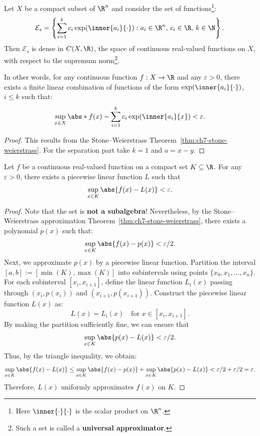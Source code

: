 \begin{corollary}\label{cor:ch7-exp-dense}
Let $X$ be a compact subset of $\R^n$ and consider the set of functions\footnote{Here $\inner{\cdot}{\cdot}$ is the scalar product on $\R^n$.}:
\begin{equation}\label{eq:ch7-exp-approx}
  \mathcal{E}_s = \left\{ \sum_{i=1}^{k} c_i \exp(\inner{a_i}{\cdot}) : a_i \in \R^n,\, c_i \in \R,\, k \in \N \right\}.
\end{equation}
Then $\mathcal{E}_s$ is dense in $C(X, \R)$, the space of continuous real-valued functions on $X$, with respect to the supremum norm\footnote{Such a set is called a \textbf{universal approximator}.}.

In other words, for any continuous function $f : X \to \R$ and any $\varepsilon > 0$, there exists a finite linear combination of functions of the form $\exp(\inner{a_i}{\cdot})$, $i \leq k$ such that:
\[
  \sup_{x \in X} \abs*{f(x) - \sum_{i=1}^{k} c_i \exp(\inner{a_i}{x})} < \varepsilon.
\]
\end{corollary}

\begin{proof}
This results from the Stone--Weierstrass Theorem~\ref{thm:ch7-stone-weierstrass}. For the separation part take $k = 1$ and $a = x - y$.
\end{proof}

\begin{corollary}\label{cor:ch7-pwl-approx}
Let $f$ be a continuous real-valued function on a compact set $K \subseteq \R$. For any $\varepsilon > 0$, there exists a piecewise linear function $L$ such that
\[
  \sup_{x \in K} \abs{f(x) - L(x)} < \varepsilon.
\]
\end{corollary}

\begin{proof}
Note that the set is \textbf{not a subalgebra}! Nevertheless, by the Stone--Weierstrass approximation Theorem~\ref{thm:ch7-stone-weierstrass}, there exists a polynomial $p(x)$ such that:
\[
  \sup_{x \in K} \abs{f(x) - p(x)} < \varepsilon/2.
\]
Next, we approximate $p(x)$ by a piecewise linear function. Partition the interval $[a, b] := [\min(K), \max(K)]$ into subintervals using points $\{x_0, x_1, \ldots, x_n\}$. For each subinterval $[x_i, x_{i+1}]$, define the linear function $L_i(x)$ passing through $(x_i, p(x_i))$ and $(x_{i+1}, p(x_{i+1}))$. Construct the piecewise linear function $L(x)$ as:
\[
  L(x) = L_i(x) \quad \text{for } x \in [x_i, x_{i+1}].
\]
By making the partition sufficiently fine, we can ensure that
\[
  \sup_{x \in K} \abs{p(x) - L(x)} < \varepsilon/2.
\]
Thus, by the triangle inequality, we obtain:
\[
  \sup_{x \in K} \abs{f(x) - L(x)} \leq \sup_{x \in K} \abs{f(x) - p(x)} + \sup_{x \in K} \abs{p(x) - L(x)} < \varepsilon/2 + \varepsilon/2 = \varepsilon.
\]
Therefore, $L(x)$ uniformly approximates $f(x)$ on $K$.
\end{proof}

